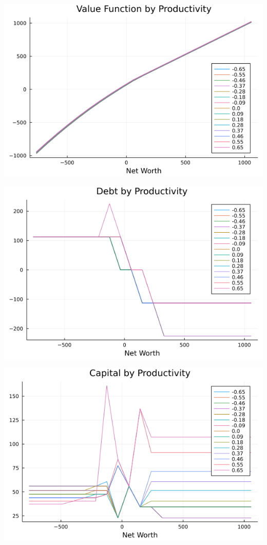 \documentclass[usenames,dvipsnames, handout]{beamer}
\begin{document}
\begin{frame}
\begin{center}
\includegraphics[scale = 0.5]{vf.png}
\end{center}
\end{frame}

\begin{frame}
\begin{center}
\includegraphics[scale = 0.5]{pf_b.png}
\end{center}
\end{frame}

\begin{frame}
\begin{center}
\includegraphics[scale = 0.5]{pf_k.png}
\end{center}
\end{frame}
\end{document}
